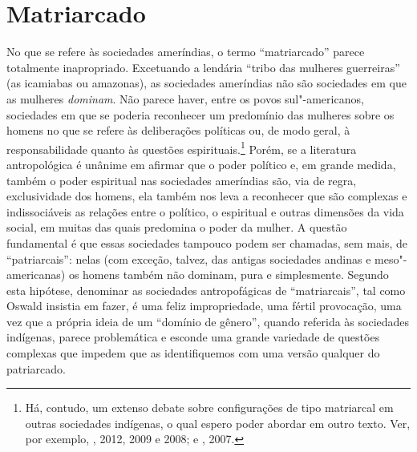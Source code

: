 \section{Matriarcado}

No que se refere às sociedades ameríndias, o termo ``matriarcado''
parece totalmente inapropriado. Excetuando a lendária ``tribo das
mulheres guerreiras'' (as icamiabas ou amazonas), as sociedades
ameríndias não são sociedades em que as mulheres \emph{dominam}. Não
parece haver, entre os povos sul"-americanos, sociedades em que se
poderia reconhecer um predomínio das mulheres sobre os homens no que se
refere às deliberações políticas ou, de modo geral, à responsabilidade
quanto às questões espirituais.\footnote{Há, contudo, um extenso debate
  sobre configurações de tipo matriarcal em outras sociedades indígenas,
  o qual espero poder abordar em outro texto. Ver, por exemplo,
  , 2012, 2009 e 2008; e , 2007.} Porém, se a
literatura antropológica é unânime em afirmar que o poder político e, em
grande medida, também o poder espiritual nas sociedades ameríndias são,
via de regra, exclusividade dos homens, ela também nos leva a reconhecer
que são complexas e indissociáveis as relações entre o político, o
espiritual e outras dimensões da vida social, em muitas das quais
predomina o poder da mulher. A questão fundamental é que essas
sociedades tampouco podem ser chamadas, sem mais, de ``patriarcais'':
nelas (com exceção, talvez, das antigas sociedades andinas e
meso"-americanas) os homens também não dominam, pura e simplesmente.
Segundo esta hipótese, denominar as sociedades antropofágicas de
``matriarcais'', tal como Oswald insistia em fazer, é uma feliz
impropriedade, uma fértil provocação, uma vez que a própria ideia de um
``domínio de gênero'', quando referida às sociedades indígenas, parece
problemática e esconde uma grande variedade de questões complexas que
impedem que as identifiquemos com uma versão qualquer do patriarcado.

